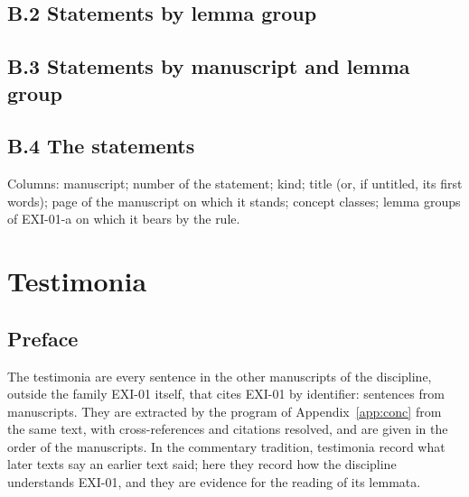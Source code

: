 \subsection*{B.2 Statements by lemma group}

{\footnotesize\par}

\subsection*{B.3 Statements by manuscript and lemma group}

{\footnotesize}

\subsection*{B.4 The statements}

{\footnotesize Columns: manuscript; number of the statement; kind; title (or, if untitled, its first words); page of the manuscript on which it stands; concept classes; lemma groups of EXI-01-a on which it bears by the rule.\par}

{\scriptsize}

\section{Testimonia}\label{app:test}

\subsection*{Preface}

The testimonia are every sentence in the other manuscripts of the discipline, outside the family EXI-01 itself, that cites EXI-01 by identifier: \cnTestimonia{} sentences from \cnTestimoniaMss{} manuscripts. They are extracted by the program of Appendix~\ref{app:conc} from the same text, with cross-references and citations resolved, and are given in the order of the manuscripts. In the commentary tradition, testimonia record what later texts say an earlier text said; here they record how the discipline understands EXI-01, and they are evidence for the reading of its lemmata.

